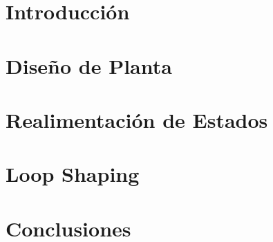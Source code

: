 




\setmainfont{AvenirLTStd-Roman}




\setmainfont{Calibri}
 

\MyIndex

\hypersetup{linkcolor=AzulInfo}

\newpage




\section{Introducción}


\section{Diseño de Planta}


\section{Realimentación de Estados}


\section{Loop Shaping}


\section{Conclusiones}



